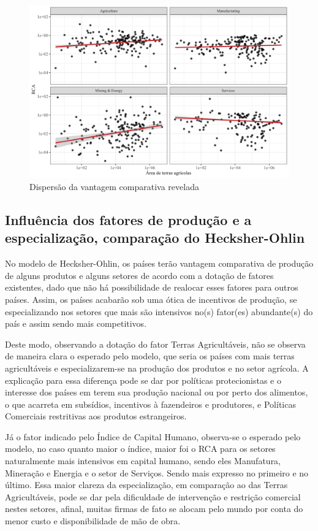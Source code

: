 \begin{figure}[!h]
    \centering
    \caption{Dispersão da vantagem comparativa revelada}
    \includegraphics*[width = 0.8\linewidth]{../plots/rca_land.png}

\end{figure}

\subsection{Influência dos fatores de produção e a especialização, comparação do Hecksher-Ohlin}

No modelo de Hecksher-Ohlin, os países terão vantagem comparativa de produção de alguns produtos e alguns setores de acordo com a dotação de fatores existentes, dado que não há possibilidade de realocar esses fatores para outros países. Assim, os países acabarão sob uma ótica de incentivos  de produção, se especializando nos setores que mais são intensivos no(s) fator(es) abundante(s) do país e assim sendo mais competitivos.

Deste modo, observando a dotação do fator Terras Agricultáveis, não se observa de maneira clara o esperado pelo modelo, que seria os países com mais terras agricultáveis e especializarem-se na produção dos produtos e no setor agrícola. A explicação para essa diferença pode se dar por políticas protecionistas e o interesse dos países em terem sua produção nacional ou por perto dos alimentos, o que acarreta em subsídios, incentivos à fazendeiros e produtores, e Políticas Comerciais restritivas aos produtos estrangeiros.

Já o fator indicado pelo Índice de Capital Humano, observa-se o esperado pelo modelo, no caso quanto maior o índice, maior foi o RCA para os setores naturalmente mais intensivos em capital humano, sendo eles Manufatura, Mineração e Energia e o setor de Serviços. Sendo mais expresso no primeiro e no último. Essa maior clareza da especialização, em comparação ao das Terras Agricultáveis, pode se dar pela dificuldade de intervenção e restrição comercial nestes setores, afinal, muitas firmas de fato se alocam pelo mundo por conta do menor custo e disponibilidade de mão de obra.

